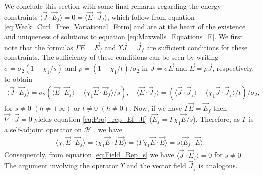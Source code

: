 \documentclass{cmslatex}
\begin{document}
We conclude this section with some final remarks regarding the energy
constraints $\langle\vec{J}\cdot\vec{E}_f\rangle=0=\langle\vec{E}\cdot\vec{J}_f\rangle$, which follow from
equation \eqref{eq:Weak_Curl_Free_Variational_Form} and are at
the heart of the existence and uniqueness of solutions to equation
\eqref{eq:Maxwells_Equations_E}. We first note
that the formulas $\Gamma\vec{E}=\vec{E}_f$ and $\Upsilon\vec{J}=\vec{J}_f$ are
sufficient conditions for these constraints. The sufficiency
of these conditions can be seen by writing $\sigma=\sigma_2(1-\chi_1/s)$ and
$\rho=(1-\chi_1/t)/\sigma_2$ in $\vec{J}=\sigma\vec{E}$ and $\vec{E}=\rho\vec{J}$,
respectively, to obtain           
% 
\begin{align}\label{eq:Field_Rep_s}
  \langle\vec{J}\cdot\vec{E}_f\rangle=\sigma_2(\langle\vec{E}\cdot\vec{E}_f\rangle-\langle\chi_1\vec{E}\cdot\vec{E}_f\rangle/s),
 \quad
  \langle\vec{E}\cdot\vec{J}_f\rangle=(\langle\vec{J}\cdot\vec{J}_f\rangle-\langle\chi_1\vec{J}\cdot\vec{J}_f\rangle/t)/\sigma_2, 
\end{align}
%
for $s\neq0$ $(h\neq\pm\infty)$ or $t\neq0$ $(h\neq0)$. Now, if we have $\Gamma\vec{E}=\vec{E}_f$ then 
$\vec{\nabla}\cdot\vec{J}=0$ yields equation \eqref{eq:Proj_rep_Ef_Jf}
($\vec{E}_f=\Gamma\chi_1\vec{E}/s$). Therefore, as $\Gamma$ is a self-adjoint
operator on $\mathscr{H}$ \cite{Folland:95}, we have     
%
\begin{align}\label{eq:Suff_Cond}
  \langle\chi_1\vec{E}\cdot\vec{E}_f\rangle=\langle\chi_1\vec{E}\cdot\Gamma\vec{E}\rangle
                    =\langle\Gamma\chi_1\vec{E}\cdot\vec{E}\rangle
                    =s\langle\vec{E}_f\cdot\vec{E}\rangle.
\end{align}
%
Consequently, from equation \eqref{eq:Field_Rep_s}
we have $\langle\vec{J}\cdot\vec{E}_f\rangle=0$ for $s\neq0$. The argument involving the
operator $\Upsilon$ and the vector field $\vec{J}_f$ is analogous.
\end{document}
